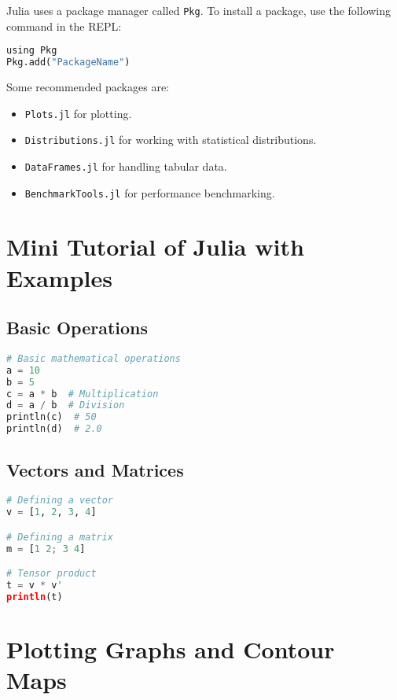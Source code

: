 \documentclass[a4paper,12pt]{article}
\begin{document}
Julia uses a package manager called \texttt{Pkg}. To install a package, use the following command in the REPL:

\begin{lstlisting}[language=Python]
using Pkg
Pkg.add("PackageName")
\end{lstlisting}

Some recommended packages are:

\begin{itemize}
    \item \texttt{Plots.jl} for plotting.
    \item \texttt{Distributions.jl} for working with statistical distributions.
    \item \texttt{DataFrames.jl} for handling tabular data.
    \item \texttt{BenchmarkTools.jl} for performance benchmarking.
\end{itemize}

\section{Mini Tutorial of Julia with Examples}

\subsection{Basic Operations}

\begin{lstlisting}[language=Python]
# Basic mathematical operations
a = 10
b = 5
c = a * b  # Multiplication
d = a / b  # Division
println(c)  # 50
println(d)  # 2.0
\end{lstlisting}

\subsection{Vectors and Matrices}

\begin{lstlisting}[language=Python]
# Defining a vector
v = [1, 2, 3, 4]

# Defining a matrix
m = [1 2; 3 4]

# Tensor product
t = v * v'
println(t)
\end{lstlisting}

\section{Plotting Graphs and Contour Maps}
\end{document}

